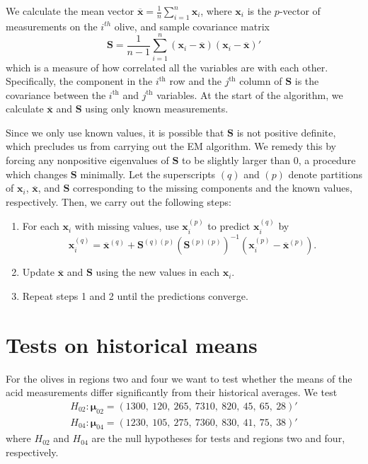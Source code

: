 \documentclass[11pt]{article}
\newcommand{\m}[1]{\mathbf{\bm{#1}}}
\begin{document}
We calculate the mean vector $\overline{\m{x}} = \frac{1}{n} \sum^{n}_{i=1} \m{x}_{i}$, where $\m{x}_i$ is the $p$-vector of measurements on the $i^{th}$ olive, and sample covariance matrix
\begin{equation*}
\m{S} = \frac{1}{n-1} \sum^{n}_{i=1} (\m{x}_{i} - \overline{\m{x}})(\m{x}_{i} - \overline{\m{x}})'
\end{equation*}
which is a measure of how correlated all the variables are with each other.  Specifically, the component in the $i^{\textrm{th}}$ row and the $j^{\textrm{th}}$ column of $\m{S}$ is the covariance between the $i^{\textrm{th}}$ and $j^{\textrm{th}}$ variables. At the start of the algorithm, we calculate $\overline{\m{x}}$ and $\m{S}$ using only known measurements.

Since we only use known values, it is possible that $\m{S}$ is not positive definite, which precludes us from carrying out the EM algorithm. We remedy this by forcing any nonpositive eigenvalues of $\m{S}$ to be slightly larger than 0, a procedure which changes $\m{S}$ minimally. Let the superscripts $(q)$ and $(p)$ denote partitions of $\m{x}_i$, $\overline{\m{x}}$, and $\m{S}$ corresponding to the missing components and the known values, respectively. Then, we carry out the following steps:
\begin{enumerate}
\item For each $\m{x}_i$ with missing values, use $\m{x}_i^{(p)}$ to predict $\m{x}_i^{(q)}$ by
\vspace{-3mm}
\begin{equation*}
\m{x}_i^{(q)} = \overline{\m{x}}^{(q)} + \m{S}^{(q)(p)}(\m{S}^{(p)(p)})^{-1}\left(\m{x}_i^{(p)}-\overline{\m{x}}^{(p)}\right). 
\end{equation*}
\vspace{-13mm}
\item Update $\overline{\m{x}}$ and $\m{S}$ using the new values in each $\m{x}_i$.
\item Repeat steps 1 and 2 until the predictions converge.
\end{enumerate}
\vspace{-4mm}

\section*{Tests on historical means}
\vspace{-4mm}
For the olives in regions two and four we want to test whether the means of the acid measurements differ significantly from their historical averages. We test 
\vspace{-3mm}
\begin{eqnarray*}
H_{02}:\m{\mu}_{02}=(1300,~120,~265,~7310,~820,~45,~65,~28)' \\
H_{04}:\m{\mu}_{04}=(1230,~105,~275,~7360,~830,~41,~75,~38)'
\end{eqnarray*}
where $H_{02}$ and $H_{04}$ are the null hypotheses for tests and regions two and four, respectively.
\end{document}
